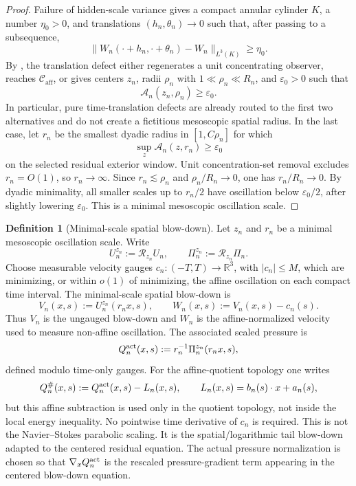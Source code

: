 \documentclass[11pt]{amsart}
\numberwithin{equation}{section}
\theoremstyle{plain}
\theoremstyle{definition}
\newtheorem{definition}[definition]{Definition}
\theoremstyle{remark}
\newcommand{\calR}{\mathcal R}
\newcommand{\Caff}{\mathcal C_{\mathrm{aff}}}
\begin{document}
\begin{proof}
Failure of hidden-scale variance gives a compact annular cylinder \(K\), a
number \(\eta_0>0\), and translations \((h_n,\theta_n)\to0\) such that, after
passing to a subsequence,
\[
   \|W_n(\cdot+h_n,\cdot+\theta_n)-W_n\|_{L^3(K)}\ge \eta_0 .
\]
By , the translation defect either
regenerates a unit concentrating observer, reaches \(\Caff\), or gives centers
\(z_n\), radii \(\rho_n\) with \(1\ll\rho_n\ll R_n\), and
\(\varepsilon_0>0\) such that
\[
   \mathcal A_n(z_n,\rho_n)\ge\varepsilon_0 .
\]
In particular, pure time-translation defects are already routed to the first
two alternatives and do not create a fictitious mesoscopic spatial radius.
In the last case, let \(r_n\) be the smallest dyadic radius in
\([1,C\rho_n]\) for which
\[
   \sup_z \mathcal A_n(z,r_n)\ge\varepsilon_0
\]
on the selected residual exterior window.  Unit concentration-set removal excludes
\(r_n=O(1)\), so \(r_n\to\infty\).  Since \(r_n\lesssim \rho_n\) and
\(\rho_n/R_n\to0\), one has \(r_n/R_n\to0\).  By dyadic minimality, all
smaller scales up to \(r_n/2\) have oscillation below \(\varepsilon_0/2\), after
slightly lowering \(\varepsilon_0\).  This is a minimal mesoscopic oscillation scale.
\end{proof}

\begin{definition}[Minimal-scale spatial blow-down]
\label{def:first-bad-spatial-blowdown}
Let \(z_n\) and \(r_n\) be a minimal mesoscopic oscillation scale.  Write
\[
   U_n^{z_n}:=\calR_{z_n}U_n,\qquad
   \Pi_n^{z_n}:=\calR_{z_n}\Pi_n .
\]
Choose measurable velocity gauges \(c_n:(-T,T)\to\mathbb R^3\), with
\(|c_n|\le M\), which are minimizing, or within \(o(1)\) of minimizing, the
affine oscillation on each compact time interval.  The minimal-scale spatial
blow-down is
\[
   V_n(x,s):=U_n^{z_n}(r_nx,s),
   \qquad
   W_n(x,s):=V_n(x,s)-c_n(s).
\]
Thus \(V_n\) is the ungauged blow-down and \(W_n\) is the affine-normalized
velocity used to measure non-affine oscillation.  The associated scaled
pressure is
\[
   Q_n^{\rm act}(x,s):=r_n^{-1}\Pi_n^{z_n}(r_nx,s),
\]
defined modulo time-only gauges.  For the affine-quotient topology one writes
\[
   Q_n^\#(x,s):=Q_n^{\rm act}(x,s)-L_n(x,s),
   \qquad L_n(x,s)=b_n(s)\cdot x+a_n(s),
\]
but this affine subtraction is used only in the quotient topology, not inside
the local energy inequality.  No pointwise time derivative of \(c_n\) is
required.
This is not the Navier--Stokes parabolic scaling.  It is the
spatial/logarithmic tail blow-down adapted to the centered residual equation.
The actual pressure normalization is chosen so that
\(\nabla_xQ_n^{\rm act}\) is the rescaled pressure-gradient term appearing in
the centered blow-down equation.
\end{definition}
\end{document}

